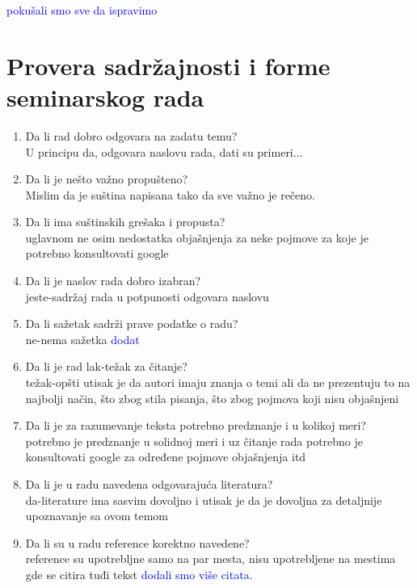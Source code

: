 \documentclass[a4paper]{report}
\newcommand{\odgovor}[1]{\textcolor{blue}{#1}}
\begin{document}
\odgovor{
  pokušali smo sve da ispravimo
}

\section{Provera sadržajnosti i forme seminarskog rada}

\begin{enumerate}
\item Da li rad dobro odgovara na zadatu temu?\\
U principu da, odgovara naslovu rada, dati su primeri...

\item Da li je nešto važno propušteno?\\
Mislim da je suština napisana tako da sve važno je rečeno.

\item Da li ima suštinskih grešaka i propusta?\\
uglavnom ne osim nedostatka objašnjenja za neke pojmove za koje je potrebno konsultovati google

\item Da li je naslov rada dobro izabran?\\
jeste-sadržaj rada u potpunosti odgovara naslovu

\item Da li sažetak sadrži prave podatke o radu?\\
ne-nema sažetka
\odgovor{dodat}

\item Da li je rad lak-težak za čitanje?\\
težak-opšti utisak je da autori imaju znanja o temi ali da ne prezentuju to na najbolji način, što zbog stila pisanja, što zbog pojmova
koji nisu objašnjeni

\item Da li je za razumevanje teksta potrebno predznanje i u kolikoj meri?\\
potrebno je predznanje u solidnoj meri i uz čitanje rada potrebno je konsultovati google za određene pojmove objašnjenja itd

\item Da li je u radu navedena odgovarajuća literatura?\\
da-literature ima sasvim dovoljno i utisak je da je dovoljna za detaljnije upoznavanje sa ovom temom

\item Da li su u radu reference korektno navedene?\\
reference su upotrebljne samo na par mesta, nisu upotrebljene na mestima gde se citira tuđi tekst
\odgovor{
  dodali smo  više citata.
}


\end{enumerate}
\end{document}
